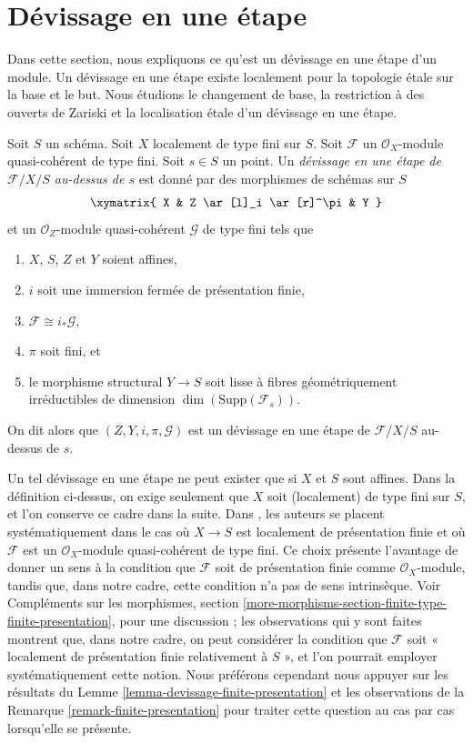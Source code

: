 \section{D\'evissage en une étape}
\label{section-one-step-devissage}

\noindent
Dans cette section, nous expliquons ce qu'est un d\'evissage en une étape d'un
module. Un d\'evissage en une étape existe localement pour la topologie \'etale sur la base et le but.
Nous étudions le changement de base, la restriction à des ouverts de Zariski et la localisation \'etale
d'un d\'evissage en une étape.

\begin{definition}
\label{definition-one-step-devissage}
Soit $S$ un schéma.
Soit $X$ localement de type fini sur $S$.
Soit $\mathcal{F}$ un $\mathcal{O}_X$-module quasi-cohérent de type fini.
Soit $s \in S$ un point.
Un {\it d\'evissage en une étape de $\mathcal{F}/X/S$ au-dessus de $s$}
est donné par des morphismes de schémas sur $S$
$$
\xymatrix{
X & Z \ar[l]_i \ar[r]^\pi & Y
}
$$
et un $\mathcal{O}_Z$-module quasi-cohérent $\mathcal{G}$ de type fini
tels que
\begin{enumerate}
\item $X$, $S$, $Z$ et $Y$ soient affines,
\item $i$ soit une immersion fermée de présentation finie,
\item $\mathcal{F} \cong i_*\mathcal{G}$,
\item $\pi$ soit fini, et
\item le morphisme structural $Y \to S$ soit lisse à
fibres géométriquement irréductibles de
dimension $\dim(\text{Supp}(\mathcal{F}_s))$.
\end{enumerate}
On dit alors que $(Z, Y, i, \pi, \mathcal{G})$ est un
d\'evissage en une étape de $\mathcal{F}/X/S$ au-dessus de $s$.
\end{definition}

\noindent
Un tel d\'evissage en une étape ne peut exister que si $X$ et $S$
sont affines. Dans la définition ci-dessus, on exige seulement que $X$ soit
(localement) de type fini sur $S$, et l'on conserve ce cadre
dans la suite. Dans \cite{GruRay}, les auteurs se placent systématiquement dans le cas
où $X \to S$ est localement de présentation finie et où $\mathcal{F}$
est un $\mathcal{O}_X$-module quasi-cohérent de type fini. Ce choix présente
l'avantage de donner un sens à la condition que $\mathcal{F}$ soit
de présentation finie comme $\mathcal{O}_X$-module, tandis que, dans notre
cadre, cette condition n'a pas de sens intrinsèque. Voir
Compléments sur les morphismes, section
\ref{more-morphisms-section-finite-type-finite-presentation},
pour une discussion ; les observations qui y sont faites montrent que, dans notre cadre,
on peut considérer la condition que $\mathcal{F}$ soit « localement de présentation
finie relativement à $S$ », et l'on pourrait employer systématiquement cette
notion. Nous préférons cependant nous appuyer sur les résultats du
Lemme \ref{lemma-devissage-finite-presentation}
et les observations de la
Remarque \ref{remark-finite-presentation}
pour traiter cette question au cas par cas lorsqu'elle se présente.

